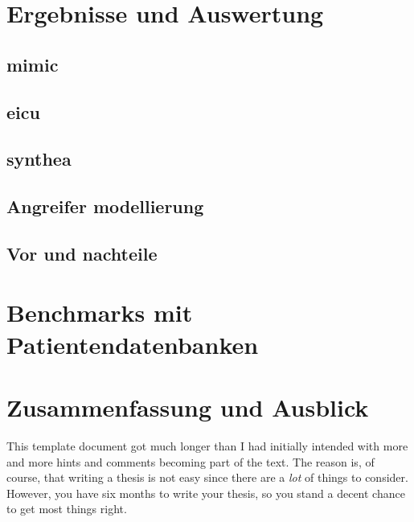 \documentclass[german,version-2020-11]{uzl-thesis}
\begin{document}
\chapter{Ergebnisse und Auswertung}
\section{mimic}
\section{eicu}
\section{synthea}
\section{Angreifer modellierung}
\section{Vor und nachteile}

\chapter{Benchmarks mit Patientendatenbanken}



\chapter{Zusammenfassung und Ausblick}

%


This template document got much longer than I had initially intended
with more and more hints and comments becoming part of the text. The
reason is, of course, that writing a thesis is not easy since there
are a \emph{lot} of things to consider. However, you have six months
to write your thesis, so you stand a decent chance to get most things 
right.
\end{document}
